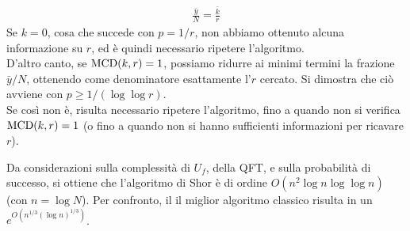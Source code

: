 \documentclass[../../InformazioneQuantistica.tex]{subfiles}
\begin{document}
\begin{enumerate}
\begin{align*}
\frac{\bar{y}}{N} = \frac{\bar{k}}{r}
\end{align*}
Se $k=0$, cosa che succede con $p=1/r$, non abbiamo ottenuto alcuna informazione su $r$, ed è quindi necessario ripetere l'algoritmo.\\
D'altro canto, se $\operatorname{MCD}(k,r)=1$, possiamo ridurre ai minimi termini la frazione $\bar{y}/N$, ottenendo come denominatore esattamente l'$r$ cercato. Si dimostra che ciò avviene con $p\geq 1/(\log\log r)$.\\
Se così non è, risulta necessario ripetere l'algoritmo, fino a quando non si verifica $\operatorname{MCD}(k,r)=1$ (o fino a quando non si hanno sufficienti informazioni per ricavare $r$).
\end{enumerate}

Da considerazioni sulla complessità di $U_f$, della QFT, e sulla probabilità di successo, si ottiene che l'algoritmo di Shor è di ordine $O(n^2 \log n \log \log n)$ (con $n=\log N$). Per confronto, il il miglior algoritmo classico risulta in un $e^{O(n^{1/3}(\log n)^{1/3})}$.
\end{document}
